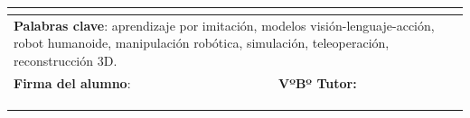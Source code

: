 \begin{table}[ht]
{\begin{tabular}{|l|l|}
				\multicolumn{2}{|l|}{}\\
				\hline
				\multicolumn{2}{|p{16cm}|}{\textbf{Palabras clave}: aprendizaje por imitación, modelos visión-lenguaje-acción, robot humanoide, manipulación robótica, simulación, teleoperación, reconstrucción 3D.}	\\ \hline
				\textbf{Firma del alumno}:\hspace{40mm} & \textbf{VºBº Tutor:}\\
				 & \\
				 & \\
				 & \\
				\hline
			\end{tabular}
		}
	\end{table}
